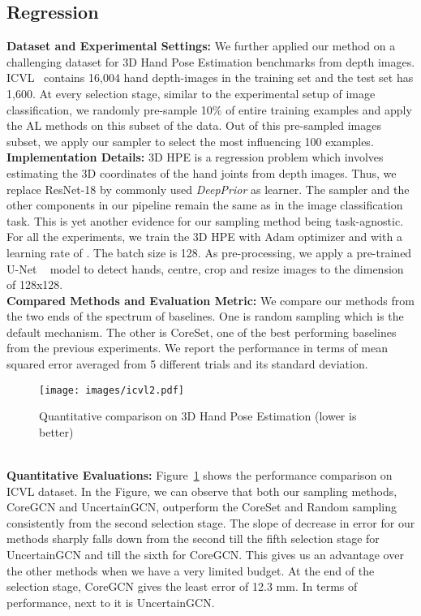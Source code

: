 \subsection{Regression} 
\noindent \textbf{Dataset and Experimental Settings:} We further applied our method on 
a challenging dataset for 3D Hand Pose Estimation benchmarks from depth images. 
ICVL~\cite{icvl} contains 16,004 hand depth-images in the training set and the test set has 1,600. At every selection stage, similar to the experimental setup of image classification, we 
randomly pre-sample 10\% of entire training examples  and apply the AL methods on 
this subset of the data. Out of this pre-sampled images subset, we apply our sampler to select the 
most influencing 100 examples.
\\
\noindent \textbf{Implementation Details:}
3D HPE is a regression problem  which involves estimating the 3D coordinates of the hand joints from depth images.
Thus, we replace ResNet-18 by commonly used \emph{DeepPrior} \cite{deepprior} as learner.
The sampler and the other components in our pipeline remain the same as in 
the image classification task. This is yet another evidence for our
sampling method being task-agnostic. For all the experiments, we train the 3D HPE with
Adam\cite{Kingma2015ADAM:Optimization} optimizer and with a learning rate of .
The batch size is 128. As pre-processing, we apply a pre-trained U-Net ~\cite{unet} model to detect hands, 
centre, crop and resize images to the dimension of 128x128.
\\
\noindent \textbf{Compared Methods and Evaluation Metric:}
We compare our methods from the two ends of the spectrum of baselines. One is random sampling 
which is the default mechanism. The other is CoreSet\cite{Sener2017ActiveApproach}, one of the best 
performing baselines from the previous experiments.
We report the performance in terms of mean squared error averaged from 5 different trials 
and its standard deviation. 
\begin{figure}\centering
\texttt{[image: images/icvl2.pdf]}
    \caption{Quantitative comparison on 3D Hand Pose Estimation (lower is better)}\label{fig:hands}\end{figure}
\\
\noindent \textbf{Quantitative Evaluations:} Figure~\ref{fig:hands} shows the performance comparison 
on ICVL dataset. In the Figure, we can observe that both our sampling methods, CoreGCN and UncertainGCN,
outperform the CoreSet and Random sampling consistently from the second selection stage.
The slope of decrease in error for our methods sharply falls down from the second 
till the fifth selection stage for UncertainGCN and till the sixth for CoreGCN. 
This gives us an advantage over the other methods when we have a very limited budget. 
At the end of the selection stage, CoreGCN gives the least error of 12.3 mm. 
In terms of performance, next to it is UncertainGCN. 
